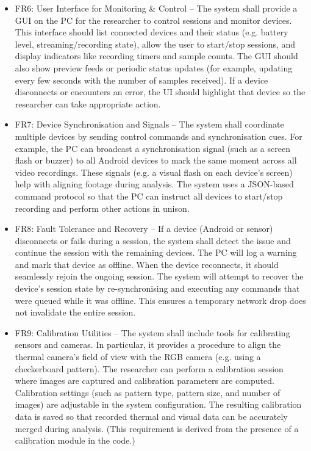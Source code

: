 \begin{itemize}
  \item FR6: User Interface for Monitoring \& Control -- The system shall provide a GUI on the PC for the researcher to control sessions and monitor devices. This interface should list connected devices and their status (e.g. battery level, streaming/recording state), allow the user to start/stop sessions, and display indicators like recording timers and sample counts. The GUI should also show preview feeds or periodic status updates (for example, updating every few seconds with the number of samples received). If a device disconnects or encounters an error, the UI should highlight that device so the researcher can take appropriate action.

  \item FR7: Device Synchronisation and Signals -- The system shall coordinate multiple devices by sending control commands and synchronisation cues. For example, the PC can broadcast a synchronisation signal (such as a screen flash or buzzer) to all Android devices to mark the same moment across all video recordings. These signals (e.g. a visual flash on each device's screen) help with aligning footage during analysis. The system uses a JSON-based command protocol so that the PC can instruct all devices to start/stop recording and perform other actions in unison.

  \item FR8: Fault Tolerance and Recovery -- If a device (Android or sensor) disconnects or fails during a session, the system shall detect the issue and continue the session with the remaining devices. The PC will log a warning and mark that device as offline. When the device reconnects, it should seamlessly rejoin the ongoing session. The system will attempt to recover the device's session state by re-synchronising and executing any commands that were queued while it was offline. This ensures a temporary network drop does not invalidate the entire session.

  \item FR9: Calibration Utilities -- The system shall include tools for calibrating sensors and cameras. In particular, it provides a procedure to align the thermal camera's field of view with the RGB camera (e.g. using a checkerboard pattern). The researcher can perform a calibration session where images are captured and calibration parameters are computed. Calibration settings (such as pattern type, pattern size, and number of images) are adjustable in the system configuration. The resulting calibration data is saved so that recorded thermal and visual data can be accurately merged during analysis. (This requirement is derived from the presence of a calibration module in the code.)


\end{itemize}

